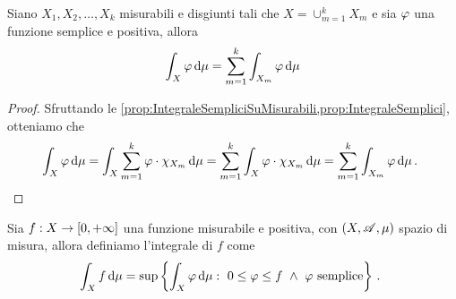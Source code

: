 \begin{corollary}\label{cor:IntegraleSempliciSpezzato}
	Siano $X_1,X_2,\dots,X_k$ misurabili e disgiunti tali che $X=\cup_{m=1}^kX_m$ e sia $\varphi$ una funzione semplice e positiva, allora
	\begin{equation*}
		\int_X \varphi \,\mathrm d \mu=\sum_{m=1}^k \int_{X_m}\varphi\,\mathrm d \mu
	\end{equation*}
\end{corollary}
\begin{proof}
	Sfruttando le \cref{prop:IntegraleSempliciSuMisurabili,prop:IntegraleSemplici}, otteniamo che
	\begin{equation*}
		\int_X \varphi \,\mathrm d \mu=\int_X\sum_{m=1}^k\varphi\cdot \chi_{X_m}\,\mathrm d\mu=\sum_{m=1}^k\int_X \varphi\cdot \chi_{X_m}\,\mathrm d\mu=\sum_{m=1}^k \int_{X_m}\varphi\,\mathrm d \mu\, \text{. }
	\end{equation*}
\end{proof}



\begin{definition}\label{def:IntegralePositive}
	Sia $f:X\to[0,+\infty]$ una funzione misurabile e positiva, con $(X,\mathscr A,\mu)$ spazio di misura, allora definiamo l'integrale di $f$ come
	\begin{equation*}
		\int_Xf\de\mu=\sup\left\{\int_X\simp\de \mu:\ 0\le \simp\le f\ \wedge\ \simp \text{ semplice}\right\}\punto
	\end{equation*}
\end{definition}

